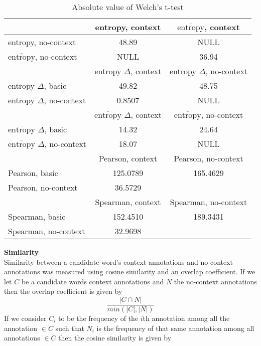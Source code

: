 \documentclass[11pt]{article}
\begin{document}
\begin{description}
\begin{table}
\centering
\begin{tabular}{l | c | c }
& \scriptsize entropy, context \scriptsize & \scriptsize $\overline{\text{entropy}}$, context \scriptsize \\
\hline
\scriptsize entropy, no-context \scriptsize & 48.89 & NULL \\
\scriptsize $\overline{\text{entropy}}$, no-context \scriptsize & NULL & 36.94 \\
\hline
& \scriptsize entropy $\Delta$, context \scriptsize & \scriptsize entropy $\Delta$, no-context \scriptsize \\
\hline
\scriptsize entropy $\Delta$, basic \scriptsize & 49.82 & 48.75 \\
\scriptsize entropy $\Delta$, no-context \scriptsize & 0.8507 & NULL \\
\hline
& \scriptsize $\overline{\text{entropy}}$ $\Delta$, context \scriptsize & \scriptsize $\overline{\text{entropy}}$, no-context  \scriptsize \\
\hline
\scriptsize $\overline{\text{entropy}}$ $\Delta$, basic \scriptsize & 14.32 & 24.64 \\
\scriptsize $\overline{\text{entropy}}$ $\Delta$, no-context \scriptsize & 18.07 & NULL \\
\hline
& \scriptsize Pearson, context \scriptsize & \scriptsize Pearson, no-context \scriptsize \\
\hline
\scriptsize Pearson, basic \scriptsize & 125.0789 & 165.4629\\
\scriptsize Pearson, no-context \scriptsize & 36.5729& \\
\hline
& \scriptsize Spearman, context \scriptsize & \scriptsize Spearman, no-context  \scriptsize \\
\hline
\scriptsize Spearman, basic \scriptsize & 152.4510 & 189.3431\\
\scriptsize Spearman, no-context \scriptsize & 32.9698 & \\
\end{tabular}
\caption{Absolute value of Welch's t-test} 
\label{tab:myfirsttable}
\end{table}

\item{\textbf{Similarity}} \\
Similarity between a candidate word's context annotations and no-context annotations was measured using cosine similarity and an overlap coefficient. If we let $C$ be a candidate words context annotations and $N$ the no-context annotations then the overlap coefficient is given by 
\[ \frac{| C \cap N|}{min(|C|,|N|)} \] 
If we consider $C_i$ to be the frequency of the $i$th annotation among all the annotation $\in C$ such that $N_i$ is the frequency of that same annotation among all annotations $\in C$ then the cosine similarity is given by 


\end{description}
\end{document}
